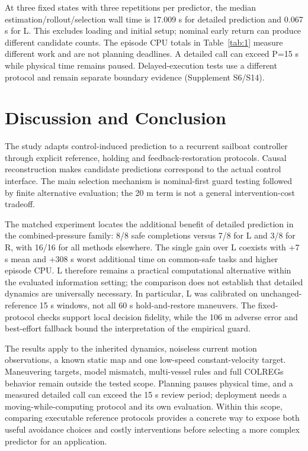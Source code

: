 \documentclass[conference]{IEEEtran}
\begin{document}
At three fixed states with three repetitions per predictor, the median estimation/rollout/selection wall time is 17.009 s for detailed prediction and 0.067 s for L. This excludes loading and initial setup; nominal early return can produce different candidate counts. The episode CPU totals in Table~\ref{tab:1} measure different work and are not planning deadlines. A detailed call can exceed P=15 s while physical time remains paused. Delayed-execution tests use a different protocol and remain separate boundary evidence (Supplement S6/S14).

\section{Discussion and Conclusion}

The study adapts control-induced prediction to a recurrent sailboat controller through explicit reference, holding and feedback-restoration protocols. Causal reconstruction makes candidate predictions correspond to the actual control interface. The main selection mechanism is nominal-first guard testing followed by finite alternative evaluation; the 20 m term is not a general intervention-cost tradeoff.

The matched experiment locates the additional benefit of detailed prediction in the combined-pressure family: 8/8 safe completions versus 7/8 for L and 3/8 for R, with 16/16 for all methods elsewhere. The single gain over L coexists with +7 s mean and +308 s worst additional time on common-safe tasks and higher episode CPU. L therefore remains a practical computational alternative within the evaluated information setting; the comparison does not establish that detailed dynamics are universally necessary. In particular, L was calibrated on unchanged-reference 15 s windows, not all 60 s hold-and-restore maneuvers. The fixed-protocol checks support local decision fidelity, while the 106 m adverse error and best-effort fallback bound the interpretation of the empirical guard.

The results apply to the inherited dynamics, noiseless current motion observations, a known static map and one low-speed constant-velocity target. Maneuvering targets, model mismatch, multi-vessel rules and full COLREGs behavior remain outside the tested scope. Planning pauses physical time, and a measured detailed call can exceed the 15 s review period; deployment needs a moving-while-computing protocol and its own evaluation. Within this scope, comparing executable reference protocols provides a concrete way to expose both useful avoidance choices and costly interventions before selecting a more complex predictor for an application.
\end{document}
